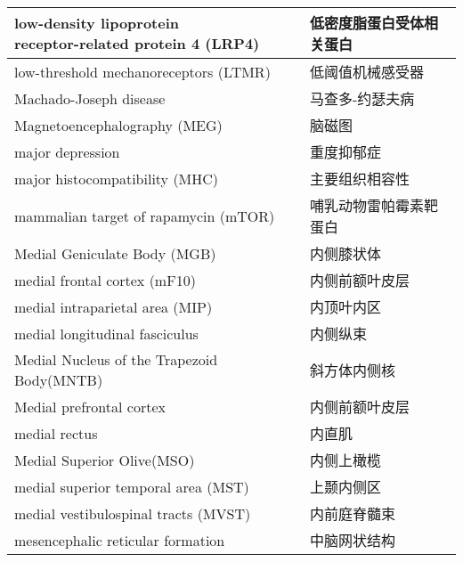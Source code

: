 \begin{longtable}{lll}
	\midrule
	\makecell{low-density lipoprotein \\receptor-related protein 4 (LRP4)}   && 低密度脂蛋白受体相关蛋白  \\
	
	\midrule
	low-threshold mechanoreceptors (LTMR)   && 低阈值机械感受器  \\
	
	\midrule
	Machado-Joseph disease   && 马查多-约瑟夫病  \\
		
	\midrule
	Magnetoencephalography (MEG)   && 脑磁图  \\
	
	\midrule
	major depression   && 重度抑郁症  \\
	
	\midrule
	major histocompatibility (MHC)   && 主要组织相容性  \\
	
	\midrule
	mammalian target of rapamycin (mTOR)   && 哺乳动物雷帕霉素靶蛋白  \\
	
	\midrule
	Medial Geniculate Body (MGB)   && 内侧膝状体  \\
	
	\midrule
	medial frontal cortex (mF10)   && 内侧前额叶皮层  \\
	
	\midrule
	medial intraparietal area (MIP)   && 内顶叶内区  \\
	
	\midrule
	medial longitudinal fasciculus   && 内侧纵束  \\
	
	\midrule
	Medial Nucleus of the Trapezoid Body(MNTB)   && 斜方体内侧核  \\
	
	\midrule
	Medial prefrontal cortex    && 内侧前额叶皮层  \\
	
	\midrule
	medial rectus    && 内直肌  \\
	
	\midrule
	Medial Superior Olive(MSO)   && 内侧上橄榄  \\
	
	\midrule
	medial superior temporal area (MST)   && 上颞内侧区  \\
	
	\midrule
	medial vestibulospinal tracts (MVST) && 内前庭脊髓束  \\
	
	\midrule
	mesencephalic reticular formation   && 中脑网状结构  \\
	

\end{longtable}
